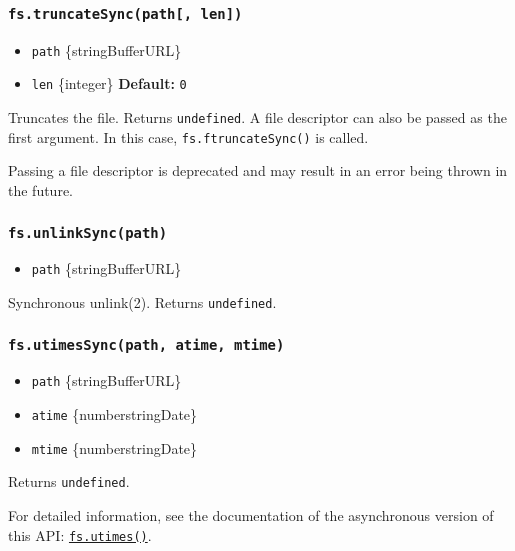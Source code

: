 \subsubsection{\texorpdfstring{\texttt{fs.truncateSync(path{[},\ len{]})}}{fs.truncateSync(path{[}, len{]})}}\label{fs.truncatesyncpath-len}

\begin{itemize}
\tightlist
\item
  \texttt{path} \{string\textbar Buffer\textbar URL\}
\item
  \texttt{len} \{integer\} \textbf{Default:} \texttt{0}
\end{itemize}

Truncates the file. Returns \texttt{undefined}. A file descriptor can
also be passed as the first argument. In this case,
\texttt{fs.ftruncateSync()} is called.

Passing a file descriptor is deprecated and may result in an error being
thrown in the future.

\subsubsection{\texorpdfstring{\texttt{fs.unlinkSync(path)}}{fs.unlinkSync(path)}}\label{fs.unlinksyncpath}

\begin{itemize}
\tightlist
\item
  \texttt{path} \{string\textbar Buffer\textbar URL\}
\end{itemize}

Synchronous unlink(2). Returns \texttt{undefined}.

\subsubsection{\texorpdfstring{\texttt{fs.utimesSync(path,\ atime,\ mtime)}}{fs.utimesSync(path, atime, mtime)}}\label{fs.utimessyncpath-atime-mtime}

\begin{itemize}
\tightlist
\item
  \texttt{path} \{string\textbar Buffer\textbar URL\}
\item
  \texttt{atime} \{number\textbar string\textbar Date\}
\item
  \texttt{mtime} \{number\textbar string\textbar Date\}
\end{itemize}

Returns \texttt{undefined}.

For detailed information, see the documentation of the asynchronous
version of this API:
\hyperref[fsutimespath-atime-mtime-callback]{\texttt{fs.utimes()}}.

